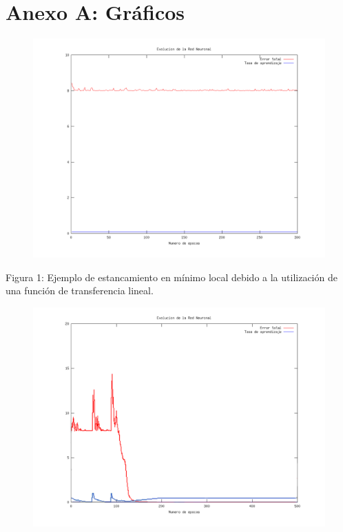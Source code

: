 \documentclass[%
    final,
    reprint,
    notitlepage,
    narroweqnarray,
    inline,
    twoside,
    invited
    ]{ieee}
\begin{document}


\clearpage
\onecolumn

\section*{Anexo A: Gráficos}

\begin{figure}[H]
\begin{center}
\includegraphics[scale=0.30]{./images/LinearConstante.png}
\label{modelado}
\end{center}
\end{figure}

\begin{center}
\par Figura 1: Ejemplo de estancamiento en mínimo local debido a la utilización de una función de transferencia lineal.
\end{center}

\begin{figure}[H]
\begin{center}
\includegraphics[scale=0.30]{./images/escapeminlocal.png}
\label{modelado}
\end{center}
\end{figure}
\end{document}

